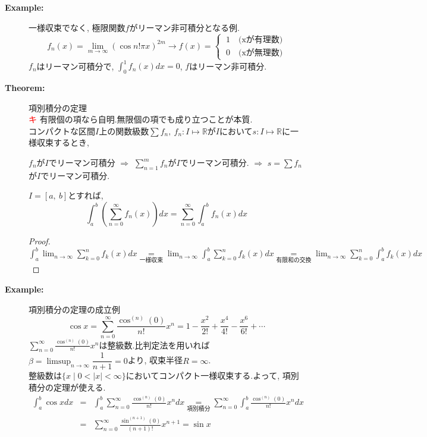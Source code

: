 \documentclass[dvipdfmx]{jsarticle}
\newcommand{\point}{\textcircled{\textcolor{red}{\scriptsize キ}} }
\begin{document}
\begin{description}
    \item[\bf{Example:}] 一様収束でなく, 極限関数$f$がリーマン非可積分となる例.
        $$ f_n(x) = \lim_{m \to \infty} ( \cos n!\pi x )^{2m} \to f(x) = \begin{cases} \ 1 \quad \text{(xが有理数)} \\ \ 0 \quad \text{(xが無理数)} \end{cases} $$
        $f_n$はリーマン可積分で, $\displaystyle \int_0^1 f_n(x) dx = 0$, $f$はリーマン非可積分.

    \item[\bf{Theorem:}] 項別積分の定理 \\
        \point 有限個の項なら自明.無限個の項でも成り立つことが本質. \\
        コンパクトな区間$I$上の関数級数$\sum f_n,\ f_n : I \mapsto \mathbb{R}$が$I$において$s :I \mapsto \mathbb{R}$に一様収束するとき, 
        \begin{center} $f_n$が$I$でリーマン可積分 $\Rightarrow$ $\sum_{n=1}^m f_n$が$I$でリーマン可積分. $\Rightarrow$ $s = \sum f_n$が$I$でリーマン可積分. \end{center}
        $I=[a,\ b]$とすれば, 
        $$ \int_a^b( \sum_{n=0}^{\infty} f_n(x)) dx = \sum_{n=0}^{\infty} \int_a^b f_n(x) dx$$
        \begin{proof}
            $ \displaystyle \int_a^b \lim_{n \to \infty} \sum_{k=0}^n f_k(x) dx \underset{一様収束}{=} \lim_{n \to \infty} \int_a^b \sum_{k=0}^n f_k(x) dx \underset{有限和の交換}{=} \lim_{n \to \infty} \sum_{k=0}^n \int_a^b f_k(x) dx$
        \end{proof}

    \item[\bf{Example:}] 項別積分の定理の成立例
        $$ \cos x = \sum_{n=0}^{\infty} \frac{\cos^{(n)}(0)}{n!} x^n = 1 - \frac{x^2}{2!} + \frac{x^4}{4!} - \frac{x^6}{6!} + \cdots $$
        $\displaystyle \sum_{n=0}^{\infty} \frac{\cos^{(n)}(0)}{n!} x^n$は整級数.比判定法を用いれば$\beta = \displaystyle \limsup_{n \to \infty} \dfrac{1}{n+1} = 0$より, 収束半径$R = \infty$. \\
        整級数は$\{ x \mid 0 < |x| < \infty\}$においてコンパクト一様収束する.よって, 項別積分の定理が使える.
        \begin{eqnarray*}
            \int_a^b \cos x dx &=& \int_a^b \sum_{n=0}^{\infty} \frac{\cos^{(n)}(0)}{n!} x^n dx \underset{項別積分}{=} \sum_{n=0}^\infty \int_a^b \frac{\cos^{(n)}(0)}{n!} x^n dx \\ 
            &=&\sum_{n=0}^{\infty} \frac{\sin^{(n+1)}(0)}{(n+1)!} x^{n+1} = \sin x
        \end{eqnarray*}


\end{description}
\end{document}
